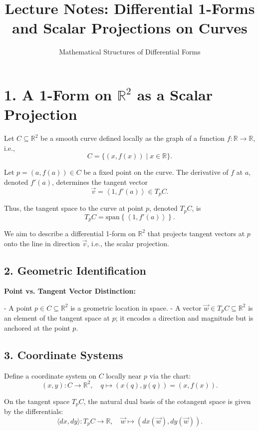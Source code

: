 \documentclass[12pt]{article}
\title{Lecture Notes: Differential 1-Forms and Scalar Projections on Curves}
\author{Mathematical Structures of Differential Forms}
\date{}
\begin{document}
	\maketitle
	
	\section*{1. A 1-Form on \(\mathbb{R}^2\) as a Scalar Projection}
	
	Let \( C \subseteq \mathbb{R}^2 \) be a smooth curve defined locally as the graph of a function \( f: \mathbb{R} \to \mathbb{R} \), i.e.,
	\[
	C = \{ (x, f(x)) \mid x \in \mathbb{R} \}.
	\]
	
	Let \( p = (a, f(a)) \in C \) be a fixed point on the curve. The derivative of \( f \) at \( a \), denoted \( f'(a) \), determines the tangent vector
	\[
	\vec{v} = \left\langle 1, f'(a) \right\rangle \in T_p C.
	\]
	
	Thus, the tangent space to the curve at point \( p \), denoted \( T_p C \), is
	\[
	T_p C = \text{span} \left\{ \left\langle 1, f'(a) \right\rangle \right\}.
	\]
	
	We aim to describe a differential 1-form on \( \mathbb{R}^2 \) that projects tangent vectors at \( p \) onto the line in direction \( \vec{v} \), i.e., the scalar projection.
	
	\subsection*{2. Geometric Identification}
	
	\textbf{Point vs. Tangent Vector Distinction:}
	
	- A point \( p \in C \subseteq \mathbb{R}^2 \) is a geometric location in space.
	- A vector \( \vec{w} \in T_p C \subseteq \mathbb{R}^2 \) is an element of the tangent space at \( p \); it encodes a direction and magnitude but is anchored at the point \( p \).
	
	\subsection*{3. Coordinate Systems}
	
	Define a coordinate system on \( C \) locally near \( p \) via the chart:
	\[
	(x,y): C \to \mathbb{R}^2,\quad q \mapsto (x(q), y(q)) = (x, f(x)).
	\]
	
	On the tangent space \( T_p C \), the natural dual basis of the cotangent space is given by the differentials:
	\[
	\langle dx, dy \rangle: T_p C \to \mathbb{R},\quad \vec{w} \mapsto \left( dx(\vec{w}), dy(\vec{w}) \right).
	\]
	
\end{document}
